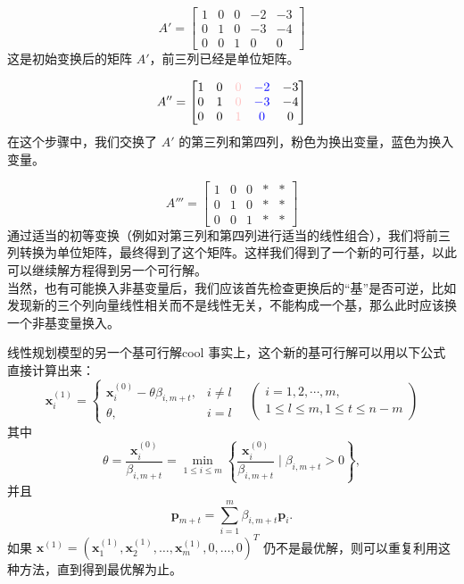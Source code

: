     \[
    A' = \begin{bmatrix}
    1 & 0 & 0 & -2 & -3 \\
    0 & 1 & 0 & -3 & -4 \\
    0 & 0 & 1 & 0 & 0
    \end{bmatrix}
    \]
    这是初始变换后的矩阵 \( A' \)，前三列已经是单位矩阵。


    \[
    A'' = \begin{bmatrix}
    1 & 0 & \textcolor{pink}{0} & \textcolor{blue}{-2} & -3 \\
    0 & 1 & \textcolor{pink}{0} & \textcolor{blue}{-3} & -4 \\
    0 & 0 & \textcolor{pink}{1} & \textcolor{blue}{0} & 0
    \end{bmatrix}
    \]
    在这个步骤中，我们交换了 \( A' \) 的第三列和第四列，粉色为换出变量，蓝色为换入变量。


    \[
    A''' = \begin{bmatrix}
    1 & 0 & 0 & * & * \\
    0 & 1 & 0 & * & * \\
    0 & 0 & 1 & * & *
    \end{bmatrix}
    \]
通过适当的初等变换（例如对第三列和第四列进行适当的线性组合），我们将前三列转换为单位矩阵，最终得到了这个矩阵。这样我们得到了一个新的可行基，以此可以继续解方程得到另一个可行解。\\
当然，也有可能换入非基变量后，我们应该首先检查更换后的“基”是否可逆，比如发现新的三个列向量线性相关而不是线性无关，不能构成一个基，那么此时应该换一个非基变量换入。
\begin{thmbox}{线性规划模型的另一个基可行解}{cool}
    事实上，这个新的基可行解可以用以下公式直接计算出来：
    \[
    \mathbf{x}_i^{(1)} = \left\{
    \begin{matrix}
    \mathbf{x}_i^{(0)} - \theta \beta_{i, m+t}, & i \neq l \\
    \theta, & i = l
    \end{matrix}
    \right.
    \quad
    \left( \begin{matrix}
    i = 1, 2, \cdots, m, \\
    1 \leq l \leq m, 1 \leq t \leq n - m
    \end{matrix} \right)
    \]
    其中
    \[
    \theta = \frac{\mathbf{x}_i^{(0)}}{\beta_{i, m+t}} = \min\limits_{1 \leq i \leq m} \left\{ \frac{\mathbf{x}_i^{(0)}}{\beta_{i, m+t}} \mid \beta_{i, m+t} > 0 \right\},
    \]
    并且
    \[
    \mathbf{p}_{m+t} = \sum\limits_{i=1}^{m} \beta_{i, m+t} \mathbf{p}_i.
    \]
    如果 \( \mathbf{x}^{(1)} = \left( \mathbf{x}_1^{(1)}, \mathbf{x}_2^{(1)}, \ldots, \mathbf{x}_m^{(1)}, 0, \ldots, 0 \right)^T \) 仍不是最优解，则可以重复利用这种方法，直到得到最优解为止。
\end{thmbox}

